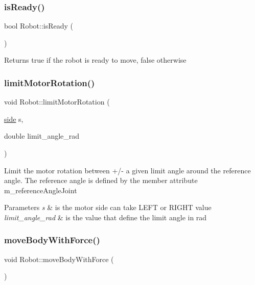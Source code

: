 \subsubsection{\texorpdfstring{is\+Ready()}{isReady()}}
{\footnotesize\ttfamily bool Robot\+::is\+Ready (\begin{DoxyParamCaption}{ }\end{DoxyParamCaption})}

\begin{DoxyReturn}{Returns}
true if the robot is ready to move, false otherwise 
\end{DoxyReturn}
\mbox{\label{class_robot_aec072eed2d38baedbbd5132b760720d0}} 
\subsubsection{\texorpdfstring{limit\+Motor\+Rotation()}{limitMotorRotation()}}
{\footnotesize\ttfamily void Robot\+::limit\+Motor\+Rotation (\begin{DoxyParamCaption}\item[{\mbox{\hyperlink{_robot_8h_afc015eff6557e84151d2e53b94375445}{side}}}]{s,  }\item[{double}]{limit\+\_\+angle\+\_\+rad }\end{DoxyParamCaption})}

Limit the motor rotation between +/-\/ a given limit angle around the reference angle. The reference angle is defined by the member attribute m\+\_\+reference\+Angle\+Joint 
\begin{DoxyParams}{Parameters}
{\em s} & is the motor side can take L\+E\+FT or R\+I\+G\+HT value \\
\hline
{\em limit\+\_\+angle\+\_\+rad} & is the value that define the limit angle in rad \\
\hline
\end{DoxyParams}
\mbox{\label{class_robot_ab713edf012849220f5096ea4b2d3e110}} 
\subsubsection{\texorpdfstring{move\+Body\+With\+Force()}{moveBodyWithForce()}}
{\footnotesize\ttfamily void Robot\+::move\+Body\+With\+Force (\begin{DoxyParamCaption}{ }\end{DoxyParamCaption})}

